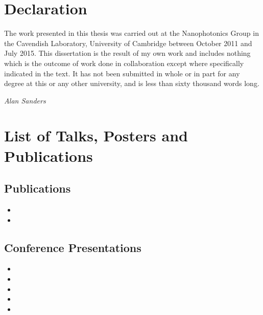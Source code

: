 \documentclass[12pt, a4paper, oneside]{book}
\begin{document}

\section*{Declaration}
The work presented in this thesis was carried out at the Nanophotonics Group in the Cavendish Laboratory, University of Cambridge between October 2011 and July 2015. This dissertation is the result of my own work and includes nothing which is the outcome of work done in collaboration except where specifically indicated in the text. It has not been submitted in whole or in part for any degree at this or any other university, and is less than sixty thousand words long.

{\flushright\emph{Alan Sanders}\par}

\section*{List of Talks, Posters and Publications}
\subsection*{Publications}
\begin{itemize}
\item {}
\item {}
\end{itemize}

\subsection*{Conference Presentations}
\begin{itemize}
\item {}
\item {}
\item {}
\item {}
\item {}
\end{itemize}
\end{document}
